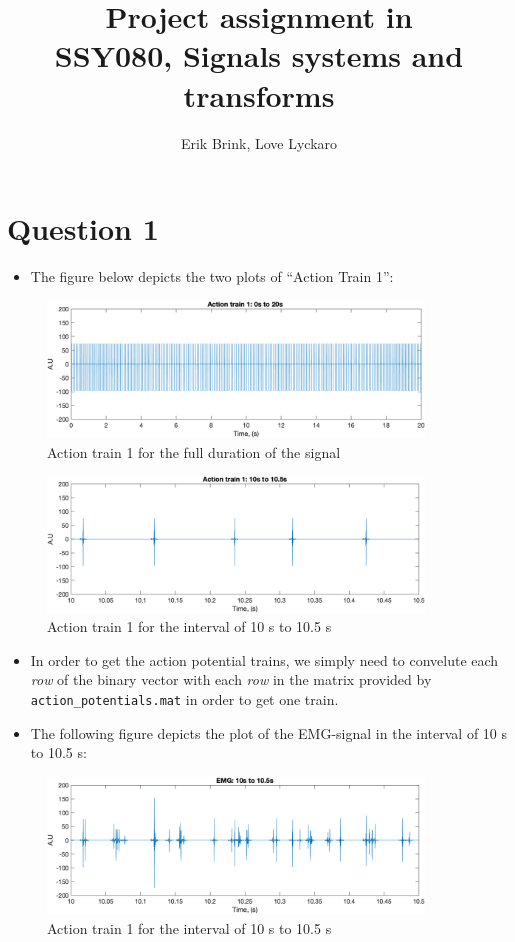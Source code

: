 \documentclass[a4paper, 12pt]{article}
\title{Project assignment in\\
       SSY080, Signals systems and transforms}
\author{Erik Brink, Love Lyckaro}
\begin{document}
\maketitle
{}
\newpage
{}

\section*{Question 1}
  \begin{itemize}
    \item The figure below depicts the two plots of ``Action Train 1'':
  \end{itemize}
  \begin{figure}[H]
    \centering
    \includegraphics[width= 10cm]{at1_0to20.png}
    \caption{Action train 1 for the full duration of the signal}
  \end{figure}
  \begin{figure}[H]
    \centering
    \includegraphics[width= 10cm]{at1_10to105.png}
    \caption{Action train 1 for the interval of 10 s to 10.5 s}
  \end{figure}
  \begin{itemize}
    \item In order to get the action potential trains, we simply need to convelute each \textit{row} of the binary vector with each \textit{row} in the matrix provided by \lstinline{action_potentials.mat} in order to get one train.
    \item The following figure depicts the plot of the EMG-signal in the interval of 10 s to 10.5 s:
  \end{itemize}
  \begin{figure}[H]
    \centering
    \includegraphics[width= 10cm]{emg_10to105.png}
    \caption{Action train 1 for the interval of 10 s to 10.5 s}
  \end{figure}
\end{document}
